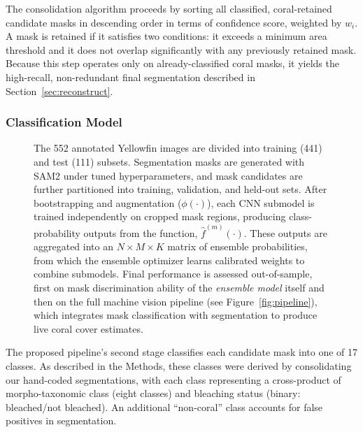 \documentclass[11pt]{elsarticle}
\newcommand{\revadd}[1]{\textcolor{red}{#1}}
\begin{document}
The consolidation algorithm proceeds by sorting all classified, coral-retained candidate masks in descending order in terms of confidence score, weighted by $w_i$. A mask is retained if it satisfies two conditions: it exceeds a minimum area threshold and it does not overlap significantly with any previously retained mask.
Because this step operates only on already-classified coral masks, it yields the high-recall, non-redundant final segmentation described in Section~\ref{sec:reconstruct}.

\subsubsection{Classification Model}
\label{sec:cnn}

\begin{figure}
    \centering
    \resizebox{0.9\textheight}{!}{%
        
    }
    \caption{The 552 annotated Yellowfin images are divided into training (441) and test (111) subsets. Segmentation masks are generated with SAM2 under tuned hyperparameters, and mask candidates are further partitioned into training, validation, and held-out sets. After bootstrapping and augmentation ($\phi(\cdot)$), each CNN submodel is trained independently on cropped mask regions, producing class-probability outputs from the function, $\hat{f}^{(m)}(\cdot)$. These outputs are aggregated into an $N \times M \times K$ matrix of ensemble probabilities, from which the ensemble optimizer learns calibrated weights to combine submodels. Final performance is assessed out-of-sample, first on mask discrimination ability of the \emph{ensemble model} itself and then on the full machine vision pipeline (see Figure~\ref{fig:pipeline}), which integrates mask classification with segmentation to produce live coral cover estimates.}
    \label{fig:training_pipeline}
\end{figure}

The proposed pipeline's second stage classifies each candidate mask into one of 17 classes. As described in the Methods, these classes were derived by consolidating our hand-coded segmentations, with each class representing a cross-product of morpho-taxonomic class (eight classes) and bleaching status (binary: bleached/not bleached). An additional ``non-coral'' class accounts for false positives in segmentation.
\end{document}
